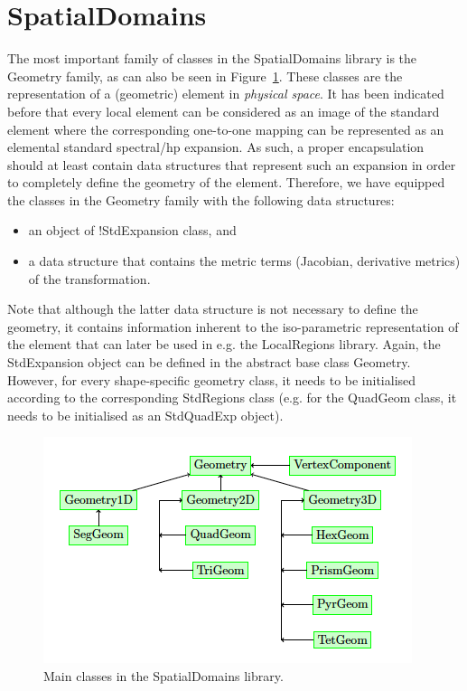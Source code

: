 \section{SpatialDomains}
The most important family of classes in the SpatialDomains library is the
Geometry family, as can also be seen in Figure~\ref{f:library:spatialdomains}.
These classes are the representation of a (geometric) element in \emph{physical
space}. It has been indicated before that every local element can be considered
as an image of the standard element where the corresponding one-to-one mapping
can be represented as an elemental standard spectral/hp expansion. As such, a
proper encapsulation should at least contain data structures that represent such
an expansion in order to completely define the geometry of the element.
Therefore, we have equipped the classes in the Geometry family with the
following data structures:

\begin{itemize}
\item an object of !StdExpansion class, and
\item a data structure that contains the metric terms (Jacobian, derivative
  metrics) of the transformation.
\end{itemize}

Note that although the latter data structure is not necessary to define the 
geometry, it contains information inherent to the iso-parametric representation
of the element that can later be used in e.g. the LocalRegions library. Again,
the StdExpansion object can be defined in the abstract base class Geometry. 
However, for every shape-specific geometry class, it needs to be initialised 
according to the corresponding StdRegions class (e.g. for the QuadGeom class, 
it needs to be initialised as an StdQuadExp object).

\begin{figure}
\centering
\includegraphics{img/SpatialDomains.png}
\caption{Main classes in the SpatialDomains library.}
\label{f:library:spatialdomains}
\end{figure}


